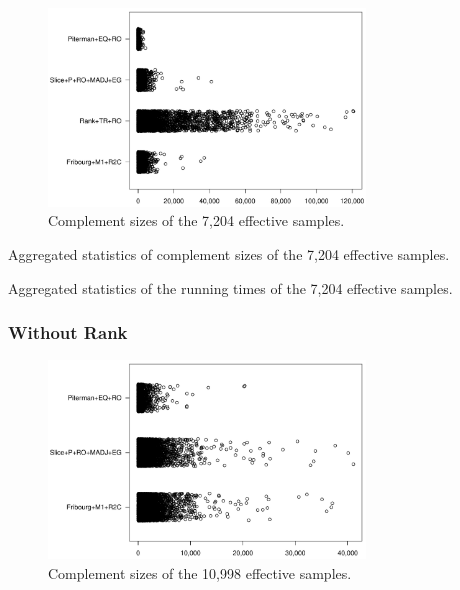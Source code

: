 \begin{figure}[ht]
\centering
\includegraphics[width=0.75\textwidth]{figures/r/external/goal/s.stripchart.with_rank.pdf}
\caption{Complement sizes of the 7,204 effective samples.}
\end{figure}

\begin{table}[ht]
\centering

\caption{Aggregated statistics of complement sizes of the 7,204 effective samples.}
\end{table}

\begin{table}[ht]
\centering

\caption{Aggregated statistics of the running times of the 7,204 effective samples.}
\end{table}


\subsubsection{Without Rank}


\begin{figure}[ht]
\centering
\includegraphics[width=0.75\textwidth]{figures/r/external/goal/s.stripchart.pdf}
\caption{Complement sizes of the 10,998  effective samples.}
\end{figure}


